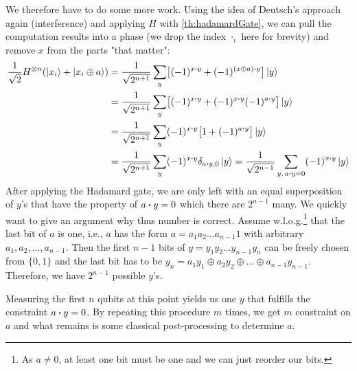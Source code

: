 				We therefore have to do some more work. Using the idea of Deutsch's approach again (interference) and applying \(H\) with \autoref{th:hadamardGate}, we can pull the computation results into a phase (we drop the index \(\cdot_i\) here for brevity) and remove \(x\) from the parts "that matter":
				\begin{align}
					\frac{1}{\sqrt{2}} H^{\otimes n} (\ket{x_i} + \ket{x_i \oplus a})
					 & = \frac{1}{\sqrt{2^{n + 1}}} \sum_y \bigl[ (-1)^{x \dotproduct y} + (-1)^{(x \oplus a) \dotproduct y} \bigr] \ket{y}             \\
					 & = \frac{1}{\sqrt{2^{n + 1}}} \sum_y \bigl[ (-1)^{x \dotproduct y} + (-1)^{x \dotproduct y} (-1)^{a \dotproduct y} \bigr] \ket{y} \\
					 & = \frac{1}{\sqrt{2^{n + 1}}} \sum_y (-1)^{x \dotproduct y} \bigl[ 1 + (-1)^{a \dotproduct y} \bigr] \ket{y}                      \\
					 & = \frac{1}{\sqrt{2^{n + 1}}} \sum_y (-1)^{x \dotproduct y} \delta_{a \dotproduct y, 0} \ket{y}
					= \frac{1}{\sqrt{2^{n - 1}}} \sum_{y,\, a \dotproduct y = 0} (-1)^{x \dotproduct y} \ket{y}
				\end{align}
				After applying the Hadamard gate, we are only left with an equal superposition of \(y\)'s that have the property of \( a \dotproduct y = 0 \) which there are \(2^{n - 1}\) many. We quickly want to give an argument why thus number is correct. Assume w.l.o.g.\footnote{As \(a \neq 0\), at least one bit must be one and we can just reorder our bits.} that the last bit of \(a\) is one, i.e., \(a\) has the form \( a = a_1 a_2 \dots a_{n - 1} 1 \) with arbitrary \( a_1, a_2, \dots, a_{n - 1} \). Then the first \(n - 1\) bits of \( y = y_1 y_2 \dots y_{n - 1} y_n \) can be freely chosen from \( \{ 0, 1 \} \) and the last bit has to be \( y_n = a_1 y_1 \oplus a_2 y_2 \oplus \dots \oplus a_{n - 1} y_{n - 1} \). Therefore, we have \(2^{n - 1}\) possible \(y\)'s.

				Measuring the first \(n\) qubits at this point yields us one \(y\) that fulfills the constraint \( a \dotproduct y = 0 \). By repeating this procedure \(m\) times, we get \(m\) constraint on \(a\) and what remains is some classical post-processing to determine \(a\).

